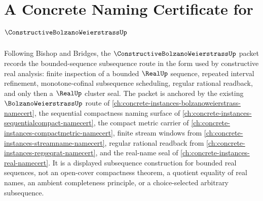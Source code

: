 \chapter{A Concrete Naming Certificate for $\ConstructiveBolzanoWeierstrassUp$}
\label{ch:concrete-instances-constructive-bolzano-weierstrass-namecert}

Following Bishop and Bridges, the $\ConstructiveBolzanoWeierstrassUp$ packet records the bounded-sequence subsequence route in the form used by constructive real analysis: finite inspection of a bounded $\RealUp$ sequence, repeated interval refinement, monotone-cofinal subsequence scheduling, regular rational readback, and only then a $\RealUp$ cluster seal. The packet is anchored by the existing $\BolzanoWeierstrassUp$ route of \autoref{ch:concrete-instances-bolzanoweierstrass-namecert}, the sequential compactness naming surface of \autoref{ch:concrete-instances-sequentialcompact-namecert}, the compact metric carrier of \autoref{ch:concrete-instances-compactmetric-namecert}, finite stream windows from \autoref{ch:concrete-instances-streamname-namecert}, regular rational readback from \autoref{ch:concrete-instances-regseqrat-namecert}, and the real-name seal of \autoref{ch:concrete-instances-real-namecert}. It is a displayed subsequence construction for bounded real sequences, not an open-cover compactness theorem, a quotient equality of real names, an ambient completeness principle, or a choice-selected arbitrary subsequence.

